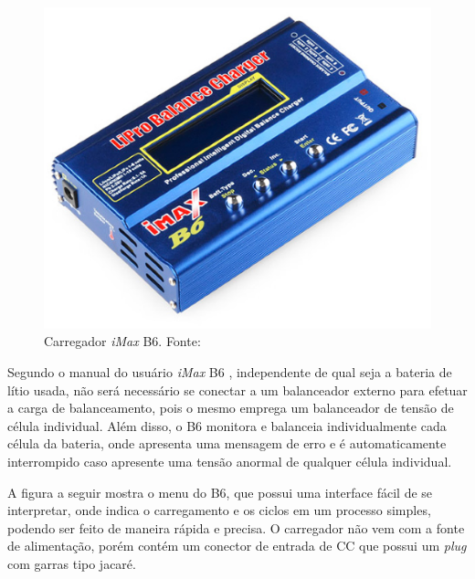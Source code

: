  \begin{figure}[H]
    \centering
	\includegraphics[keepaspectratio=true,scale=0.2]{figuras/carregador1.eps}
    \caption{Carregador \textit{iMax} B6. Fonte: \cite{carregador1}}
    \label{fig:carregador1}
\end{figure}


Segundo o manual do usuário \textit{iMax} B6 \cite{ibmax}, independente de qual seja a bateria de lítio usada, não será necessário se conectar a um balanceador externo para efetuar a carga de balanceamento, pois o mesmo emprega um balanceador de tensão de célula individual. Além disso, o B6 monitora e balanceia individualmente cada célula da bateria, onde apresenta uma mensagem de erro e é automaticamente interrompido caso apresente uma tensão anormal de qualquer célula individual. 

A figura a seguir mostra o menu do B6, que possui uma interface fácil de se interpretar, onde indica o carregamento e os ciclos em um processo simples, podendo ser feito de maneira rápida e precisa. O carregador não vem com a fonte de alimentação, porém contém um conector de entrada de CC que possui um \textit{plug} com garras tipo jacaré.

